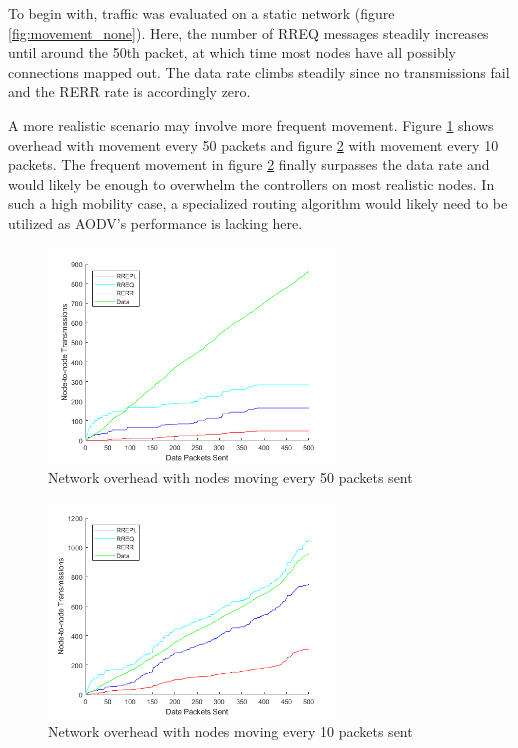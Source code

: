 \documentclass[conference]{IEEEtran}
\begin{document}
To begin with, traffic was evaluated on a static network (figure \ref{fig:movement_none}).
Here, the number of RREQ messages steadily increases until around the 50th packet, at which time most nodes have all possibly connections mapped out. The data rate climbs steadily since no transmissions fail and the RERR rate is accordingly zero.

A more realistic scenario may involve more frequent movement. Figure \ref{fig:movement_50} shows overhead with movement every 50 packets and figure \ref{fig:movement_10} with movement every 10 packets. The frequent movement in figure \ref{fig:movement_10} finally surpasses the data rate and would likely be enough to overwhelm the controllers on most realistic nodes. In such a high mobility case, a specialized routing algorithm would likely need to be utilized as AODV's performance is lacking here.

\begin{figure}[ht]
	\centering
	\includegraphics[width=3in]{movement_50.png}
	\caption{Network overhead with nodes moving every 50 packets sent}
	\label{fig:movement_50}
\end{figure}

\begin{figure}[ht]
	\centering
	\includegraphics[width=3in]{movement_10.png}
	\caption{Network overhead with nodes moving every 10 packets sent}
	\label{fig:movement_10}
\end{figure}
\end{document}
